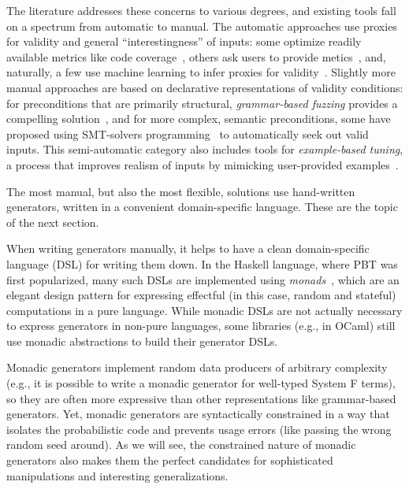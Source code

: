 The literature addresses these concerns to various degrees, and existing tools
fall on a spectrum from automatic to manual. The automatic approaches use
proxies for validity and general ``interestingness'' of inputs: some optimize
readily available metrics like code coverage~\cite{afl-readme}, others ask users
to provide metics~\cite{loscher2017targetedpbt}, and, naturally, a few use
machine learning to infer proxies for validity~\cite{godefroid2017learn,
DBLP:conf/icse/ReddyLPS20}. Slightly more manual approaches are based on
declarative representations of validity conditions: for preconditions that are
primarily structural, {\em grammar-based fuzzing} provides a compelling
solution~\cite{godefroid2008grammar, holler2012fuzzing, veggalam2016ifuzzer,
wang2019superion, srivastava2021gramatron}, and for more complex, semantic
preconditions, some have proposed using SMT-solvers
programming~\cite{dewey2017automated, LuckPOPL, steinhofel2022input} to
automatically seek out valid inputs. This semi-automatic category also includes
tools for {\em example-based tuning}, a process that improves realism of inputs
by mimicking user-provided examples~\cite{soremekun2020inputs}.

The most manual, but also the most flexible, solutions use hand-written
generators, written in a convenient domain-specific language. These are the
topic of the next section.

When writing generators manually, it helps to have a clean domain-specific
language (DSL) for writing them down. In the Haskell language, where PBT was
first popularized, many such DSLs are implemented using {\em
monads\/}~\cite{moggi1991notions}, which are an elegant design pattern for
expressing effectful (in this case, random and stateful) computations in a pure
language. While monadic DSLs are not actually necessary to express generators in
non-pure languages, some libraries (e.g., in OCaml) still use monadic
abstractions to build their generator DSLs.

Monadic generators implement random data producers of arbitrary complexity
(e.g., it is possible to write a monadic generator for well-typed System F
terms), so they are often more expressive than other representations like
grammar-based generators.  Yet, monadic generators are syntactically constrained
in a way that isolates the probabilistic code and prevents usage errors (like
passing the wrong random seed around). As we will see, the constrained nature of
monadic generators also makes them the perfect candidates for sophisticated
manipulations and interesting generalizations.

